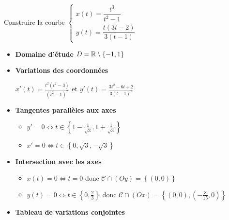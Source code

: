 \begin{frame}
\begin{exemple}
	Construire la courbe 
$\left\{
\begin{array}{l}
x(t)=\dfrac{t^3}{t^2-1}\\[3mm]
y(t)=\dfrac{t(3t-2)}{3(t-1)}
\end{array}
\right.$

\pause

\begin{itemize}
	\item \textbf{Domaine d'étude} \pause $D=\mathbb{R}\setminus\{-1,1\}$ \pause
	
	\item \textbf{Variations des coordonnées}
	\pause
	\medskip\\
\centerline{$x'(t)=\frac{t^2(t^2-3)}{(t^2-1)^2}$ \quad et \quad $y'(t)=\frac{3t^2-6t+2}{3(t-1)^2}$}
	\pause

	\item \textbf{Tangentes parallèles aux axes} 
	\pause
	\begin{itemize}
	  \item $y'=0 \iff t\in\left\{ 1-\frac{1}{\sqrt{3}},1+\frac{1}{\sqrt{3}}\right\}$
	  \pause
	  \item $x'=0 \iff t\in\left\{ 0, \sqrt{3},-\sqrt{3}\right\}$
	\end{itemize}

	\pause
        \item \textbf{Intersection avec les axes}
        \pause
        \begin{itemize}
          \item $x(t)=0 \iff t=0$ \quad\pause donc $\mathcal C \cap (Oy)=\left\{(0,0)\right\}$
          \pause
          \item $y(t)=0 \iff t \in \left\{0,\frac{2}{3}\right\}$ \quad\pause donc $\mathcal C \cap (Ox)=\left\{(0,0),(-\frac{8}{15},0) \right\}$
        \end{itemize}

\end{itemize}
\end{exemple}
\end{frame}


\begin{frame}
        

\begin{itemize}
        \item  \textbf{Tableau de variations conjointes}        
\end{itemize}


\end{frame}

